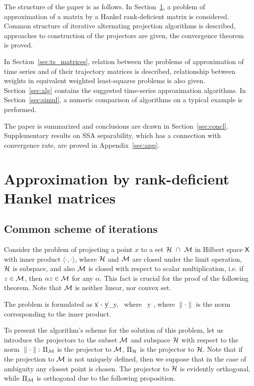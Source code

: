 \documentclass[sii]{ipart}
\begin{document}
The structure of the paper is as follows.  In Section~\ref{sec:lowrank_appr}, a problem of approximation of a matrix by a Hankel rank-deficient matrix is considered. Common structure of iterative alternating projection algorithms is described, approaches to construction of the projectors are given, the convergence theorem is proved.

In Section~\ref{sec:ts_matrices}, relation between the problems of approximation of time series and of their trajectory matrices is described, relationship between weights in equivalent weighted least-squares problems is also given. Section~\ref{sec:alg} contains the suggested time-series approximation algorithms. In Section~\ref{sec:simul}, a numeric comparison of algorithms on a typical example is performed.

The paper is summarized and conclusions are drawn in Section~\ref{sec:concl}. Supplementary results on SSA separability, which has a connection with convergence rate, are proved in Appendix~\ref{sec:app}.

\section{Approximation by rank-deficient Hankel matrices}
\label{sec:lowrank_appr}
\subsection{Common scheme of iterations}
Consider the problem of projecting a point $x$ to a set $\mathcal{H}~ \cap~\mathcal{M}$ in Hilbert space $\mathsf{X}$ with inner product $\langle \cdot, \cdot \rangle$, where $\mathcal{H}$ and $\mathcal{M}$ are closed under the limit operation, $\mathcal{H}$ is subspace, and also $\mathcal{M}$ is closed with respect to scalar multiplication, i.e.
if $z \in \mathcal{M}$, then $\alpha z\in \mathcal{M}$ for any $\alpha$. This fact is crucial for the proof of the following theorem. Note that  $\mathcal{M}$ is neither  linear, nor convex set.

The problem is formulated as
\be
\label{eq:gen_task}
\|x - y\| \to \min_y, \mbox{\ where\ } y \in \calH \cap \calM,
\ee
where $\|\cdot\|$ is the norm corresponding to the inner product.

To present the algorithm's scheme for the solution of this problem, let us introduce the projectors to the subset $\mathcal{M}$ and subspace $\mathcal{H}$ with respect to the norm $\|\cdot\|$: $\Pi_{\mathcal{M}}$ is the projector to $\mathcal{M}$,
$\Pi_{\mathcal{H}}$ is the projector to $\mathcal{H}$.
Note that if the projection to $\mathcal{M}$ is not uniquely defined, then we suppose that in the case of ambiguity any closest point is chosen.
The projector to $\mathcal{H}$ is evidently orthogonal, while $\Pi_{\mathcal{M}}$ is orthogonal due to the following proposition.
\end{document}
